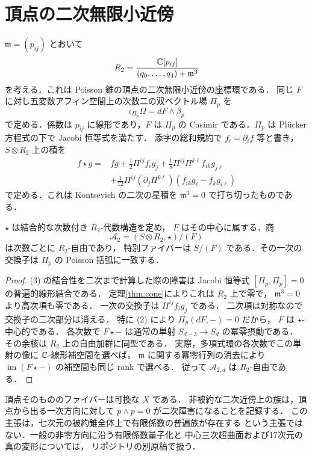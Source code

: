 \section{頂点の二次無限小近傍}
$\mathfrak m=(p_{ij})$ とおいて
\[
R_2=
\frac{\mathbb C[p_{ij}]}
{(q_0,\ldots,q_4)+\mathfrak m^3}
\]
を考える．これは Poisson 錐の頂点の二次無限小近傍の座標環である．
同じ $F$ に対し五変数アフィン空間上の次数二の双ベクトル場
$\Pi_p$ を
\[
\iota_{\Pi_p}\Omega=dF\wedge\beta_p
\tag{2}
\]
で定める．係数は $p_{ij}$ に線形であり，$F$ は
$\Pi_p$ の Casimir である．$\Pi_p$ は Pl\"ucker 方程式の下で
Jacobi 恒等式を満たす．
添字の総和規約で $f_i=\partial_i f$ 等と書き，$S\otimes R_2$ 上の積を
\[
\begin{aligned}
f\star g={}&fg+\frac12\Pi^{ij}f_i g_j
+\frac18\Pi^{ij}\Pi^{k\ell}f_{ik}g_{j\ell}\\
&+\frac1{12}\Pi^{ij}(\partial_j\Pi^{k\ell})
  (f_{ik}g_\ell-f_k g_{i\ell})
\end{aligned}
\tag{3}
\]
で定める．これは Kontsevich の二次の星積を
$\mathfrak m^3=0$ で打ち切ったものである．
\begin{theorem}[普遍二次ジェットの平坦量子化]
$\star$ は結合的な次数付き $R_2$-代数構造を定め，
$F$ はその中心に属する．商
\[
\mathcal A_2=(S\otimes R_2,\star)/(F)
\]
は次数ごとに $R_2$-自由であり，
特別ファイバーは $S/(F)$ である．その一次の交換子は
$\Pi_p$ の Poisson 括弧に一致する．
\end{theorem}
\begin{proof}
(3) の結合性を二次まで計算した際の障害は
Jacobi 恒等式 $[\Pi_p,\Pi_p]=0$ の普遍的線形結合である．
定理\ref{thm:cone}によりこれは $R_2$ 上で零で，
$\mathfrak m^3=0$ より高次項も零である．
一次の交換子は $\Pi^{ij}f_i g_j$ である．
二次項は対称なので交換子の二次部分は消える．
特に (2) により $\Pi_p(dF,-)=0$ だから，
$F$ は $\star$-中心的である．
各次数で $F\star-$ は通常の単射
$S_{d-3}\to S_d$ の冪零摂動である．
その余核は $R_2$ 上の自由加群に同型である．
実際，多項式環の各次数でこの単射の像に
$\mathbb C$-線形補空間を選べば，
$\mathfrak m$ に関する冪零行列の消去により
$\operatorname{im}(F\star-)$ の補空間も同じ rank で選べる．
従って $\mathcal A_{2,d}$ は $R_2$-自由である．
\end{proof}

\begin{remark}[意味と限界]
頂点そのもののファイバーは可換な $X$ である．
非被約な二次近傍上の族は，頂点から出る一次方向に対して
$p\wedge p=0$ が二次障害になることを記録する．
この主張は，七次元の被約錐全体上で有限係数の普遍族が存在する
という主張ではない．一般の非零方向に沿う有限係数量子化と
中心三次超曲面および17次元の真の変形については，
リポジトリの別原稿で扱う．
\end{remark}

